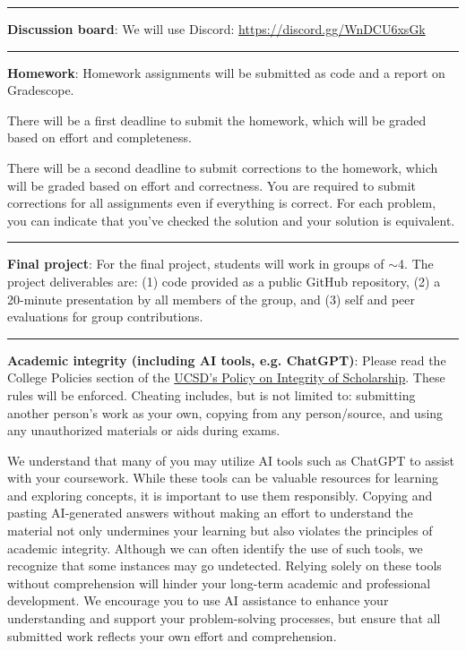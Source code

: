 \documentclass[12pt]{article}
\begin{document}

\begin{center}
  \rule{\textwidth}{0.5pt}
\end{center}

\noindent\textbf{Discussion board}: We will use Discord: \href{https://discord.gg/WnDCU6xsGk}{https://discord.gg/WnDCU6xsGk}

\begin{center}
  \rule{\textwidth}{0.5pt}
\end{center}


\noindent\textbf{Homework}: Homework assignments will be submitted as code and a report on Gradescope.

There will be a first deadline to submit the homework, which will be graded based on effort and completeness.

There will be a second deadline to submit corrections to the homework, which will be graded based on effort and correctness.
You are required to submit corrections for all assignments even if everything is correct.
For each problem, you can indicate that you've checked the solution and your solution is equivalent.

\begin{center}
  \rule{\textwidth}{0.5pt}
\end{center}

\noindent\textbf{Final project}:
For the final project, students will work in groups of $\sim$4.
The project deliverables are: (1) code provided as a public GitHub repository, (2) a 20-minute presentation by all members of the group, and (3) self and peer evaluations for group contributions.

\begin{center}
  \rule{\textwidth}{0.5pt}
\end{center}

\noindent\textbf{Academic integrity (including AI tools, e.g. ChatGPT)}: Please read the College Policies section of the \href{http://senate.ucsd.edu/Operating-Procedures/Senate-Manual/Appendices/2}{UCSD's Policy on Integrity of Scholarship}.
These rules will be enforced.
Cheating includes, but is not limited to: submitting another person's work as your own, copying from any person/source, and using any unauthorized materials or aids during exams.

We understand that many of you may utilize AI tools such as ChatGPT to assist with your coursework.
While these tools can be valuable resources for learning and exploring concepts, it is important to use them responsibly.
Copying and pasting AI-generated answers without making an effort to understand the material not only undermines your learning but also violates the principles of academic integrity.
Although we can often identify the use of such tools, we recognize that some instances may go undetected.
Relying solely on these tools without comprehension will hinder your long-term academic and professional development.
We encourage you to use AI assistance to enhance your understanding and support your problem-solving processes, but ensure that all submitted work reflects your own effort and comprehension.
\end{document}
